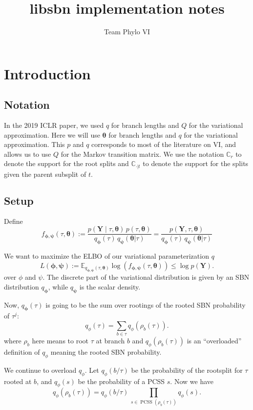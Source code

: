 \documentclass{article}
\title{libsbn implementation notes}
\author{Team Phylo VI}
\newcommand{\PCSS}{\operatorname{PCSS}}
\begin{document}
\maketitle


\section*{Introduction}

\subsection*{Notation}

In the 2019 ICLR paper, we used $q$ for branch lengths and $Q$ for the variational approximation.
Here we will use $\bm \theta$ for branch lengths and $q$ for the variational approximation.
This $p$ and $q$ corresponds to most of the literature on VI, and allows us to use $Q$ for the Markov transition matrix. We use the notation $\mathbb{C}_r$ to denote the support for the root splits and $\mathbb{C}_{\cdot|t}$ to denote the support for the splits given the parent subsplit of $t$.

\subsection*{Setup}

Define
\[
    f_{\bm{\phi},{\bm{\psi}}}(\tau, \bm \theta) :=
    \frac{p(\bm{Y} \mid \tau, \bm{\theta}) \, p(\tau, \bm{\theta})}
    {q_{\bm{\phi}}(\tau)\, q_{\bm{\psi}}(\bm{\theta}|\tau)}
    = \frac{p(\bm{Y}, \tau, \bm{\theta})}
    {q_{\bm{\phi}}(\tau)\, q_{\bm{\psi}}(\bm{\theta}|\tau)}
\]

We want to maximize the ELBO of our variational parameterization $q$
\[
L(\bm{\phi},{\bm{\psi}}) :=
\mathbb{E}_{q_{\bm{\phi},{\bm{\psi}}}(\tau, \bm{\theta})}
\log\left( f_{\bm{\phi},{\bm{\psi}}}(\tau, \bm \theta) \right) \leq \log p(\bm{Y}).
\]
over $\phi$ and $\psi$.
The discrete part of the variational distribution is given by an SBN distribution $q_{\bm\phi}$, while $q_{\bm\psi}$ is the scalar density.

Now, $q_{\bm{\phi}}(\tau)$ is going to be the sum over rootings of the rooted SBN probability of $\tau^j$:
\[
    q_\phi(\tau) = \sum_{b \in \tau} q_\phi(\rho_b(\tau)).
\]
where $\rho_b$ here means to root $\tau$ at branch $b$ and $q_\phi(\rho_b(\tau))$ is an ``overloaded'' definition of $q_\phi$ meaning the rooted SBN probability.

We continue to overload $q_\phi$.
Let $q_\phi(b \slash \tau)$ be the probability of the rootsplit for $\tau$ rooted at $b$, and
$q_\phi(s)$ be the probability of a PCSS $s$.
Now we have
\begin{equation}
    q_\phi(\rho_b(\tau)) = q_\phi(b \slash \tau) \, \prod_{s \in \PCSS(\rho_b(\tau))} q_\phi(s).
    \label{eq:qRooted}
\end{equation}
\end{document}

